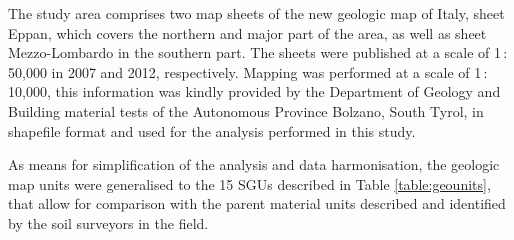 \documentclass[preprint,12pt,authoryear]{elsarticle}
\begin{document}
The study area comprises two map sheets of the new geologic map of Italy, sheet Eppan,  which covers the northern and major part of the area, as well as sheet Mezzo-Lombardo in the southern part. The sheets were published at a scale of 1\,:\,50,000 in 2007 and 2012, respectively. Mapping was performed at a scale of 1\,:\,10,000, this information was kindly provided by the Department of Geology and Building material tests of the Autonomous Province Bolzano, South Tyrol, in shapefile format and used for the analysis performed in this study.
 
As means for simplification of the analysis and data harmonisation, the geologic map units were generalised to the 15 SGUs described in Table \ref{table:geounits}, that allow for comparison with the parent material units described and identified by the soil surveyors in the field.
\end{document}
